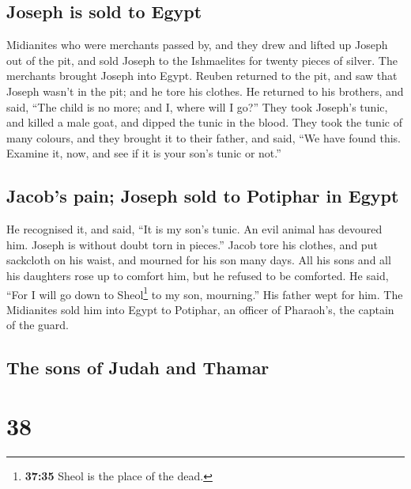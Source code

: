 \hypertarget{joseph-is-sold-to-egypt}{%
\subsection{Joseph is sold to Egypt}\label{joseph-is-sold-to-egypt}}

 Midianites who were merchants passed by, and they drew
and lifted up Joseph out of the pit, and sold Joseph to the Ishmaelites
for twenty pieces of silver. The merchants brought Joseph into Egypt.
 Reuben returned to the pit, and saw that Joseph wasn't
in the pit; and he tore his clothes.  He returned to his
brothers, and said, ``The child is no more; and I, where will I go?''
 They took Joseph's tunic, and killed a male goat, and
dipped the tunic in the blood.  They took the tunic of
many colours, and they brought it to their father, and said, ``We have
found this. Examine it, now, and see if it is your son's tunic or not.''

\hypertarget{jacobs-pain-joseph-sold-to-potiphar-in-egypt}{%
\subsection{Jacob's pain; Joseph sold to Potiphar in
Egypt}\label{jacobs-pain-joseph-sold-to-potiphar-in-egypt}}

 He recognised it, and said, ``It is my son's tunic. An
evil animal has devoured him. Joseph is without doubt torn in pieces.''
 Jacob tore his clothes, and put sackcloth on his waist,
and mourned for his son many days.  All his sons and all
his daughters rose up to comfort him, but he refused to be comforted. He
said, ``For I will go down to Sheol\footnote{\textbf{37:35} Sheol is the
  place of the dead.} to my son, mourning.'' His father wept for him.
 The Midianites sold him into Egypt to Potiphar, an
officer of Pharaoh's, the captain of the guard.

\hypertarget{the-sons-of-judah-and-thamar}{%
\subsection{The sons of Judah and
Thamar}\label{the-sons-of-judah-and-thamar}}

\hypertarget{section-37}{%
\section{38}\label{section-37}}

